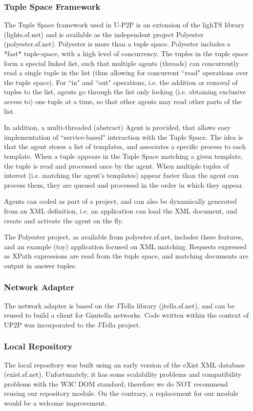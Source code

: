 \documentclass[titlepage]{article}%
\begin{document}
\subsubsection{Tuple Space Framework}
The Tuple Space framework used in U-P2P is an extension of the lighTS library (lights.sf.net) and is available as the independent project Polyester (polyester.sf.net). Polyester is more than a tuple space. Polyester includes a *fast* tuple-space, with a high level of concurrency. The tuples in the tuple space form a special linked list, such that multiple agents (threads) can concurrently read a single tuple in the list (thus allowing for concurrent ``read" operations over the tuple space). For ``in" and ``out" operations, i.e. the addition or removal of tuples to the list, agents go through the list only locking (i.e. obtaining exclusive access to) one tuple at a time, so that other agents may read other parts of the list.

In addition, a multi-threaded (abstract) Agent is provided, that allows easy implementation of ``service-based" interaction with the Tuple Space. The idea is that the agent stores a list of templates, and associates a specific process to each template. When a tuple appears in the Tuple Space matching a given template, the tuple is read and processed once by the agent. When multiple tuples of interest (i.e. matching the agent's templates) appear faster than the agent can process them, they are queued and processed in the order in which they appear.

Agents can coded as part of a project, and can also be dynamically generated from an XML definition, i.e. an application can load the XML document, and create and activate the agent on the fly.

The Polyester project, as available from polyester.sf.net, includes these features, and an example (toy) application focused on XML matching. 
Requests expressed as XPath expressions are read from the tuple space, and matching documents are output in answer tuples.

\subsubsection{Network Adapter}
The network adapter is based on the JTella library (jtella.sf.net), and can be reused to build a client for Gnutella networks. Code written within the context of UP2P was incorporated to the JTella project.

\subsubsection{Local Repository}
The local repository was built using an early version of the eXist XML database (exist.sf.net). Unfortunately, it has some scalability problems and compatibility problems with the W3C DOM standard, therefore we do NOT recommend reusing our repository module. On the contrary, a replacement for our module would be a welcome improvement.
\end{document}
